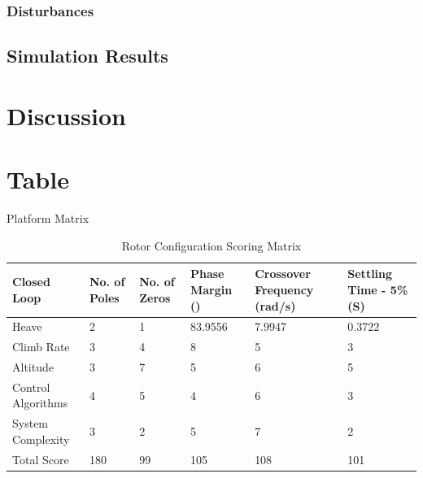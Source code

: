		\subsubsection{Disturbances}
		
		
		\subsection{Simulation Results}
			
			\section{Discussion}
			
			\section{Table}
			Platform Matrix
			\begin{table}[!]
				\centering
				\begin{tabular}{l | l | l | l | p{2cm} | p{2cm} |}
					Closed Loop & No. of Poles & No. of Zeros & Phase Margin (\textdegree) & Crossover Frequency (rad/s) & Settling Time - 5\% (S)\\
					\hline\hline
					Heave 	   				& 2 & 1 & 83.9556 & 7.9947 & 0.3722\\
					Climb Rate 			    & 3 & 4 & 8 & 5 & 3\\
					Altitude		 	  	& 3 & 7 & 5 & 6 & 5\\
					Control Algorithms  	& 4 & 5 & 4 & 6 & 3\\
					System Complexity 		& 3 & 2 & 5 & 7 & 2\\
					\hline\hline
					Total Score 			& 180 & 99 & 105 & 108 & 101\\
				\end{tabular}
				\label{tab:PlatformDesign}
				\caption{Rotor Configuration Scoring Matrix}
			\end{table}
		